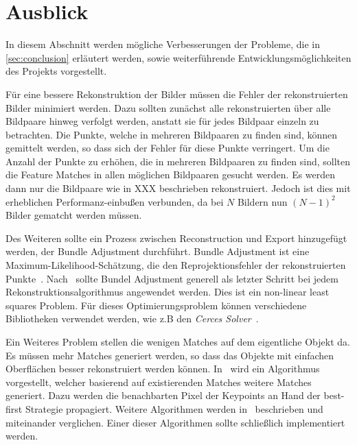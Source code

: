 \chapter{Ausblick}
\label{sec:outlook}

In diesem Abschnitt werden mögliche Verbesserungen der Probleme, die in \cref{sec:conclusion} erläutert werden, sowie weiterführende Entwicklungsmöglichkeiten des Projekts vorgestellt.

Für eine bessere Rekonstruktion der Bilder müssen die Fehler der rekonstruierten Bilder minimiert werden.
Dazu sollten zunächst alle rekonstruierten über alle Bildpaare hinweg verfolgt werden, anstatt sie für jedes Bildpaar einzeln zu betrachten.
Die Punkte, welche in mehreren Bildpaaren zu finden sind, können gemittelt werden, so dass sich der Fehler für diese Punkte verringert.
Um die Anzahl der Punkte zu erhöhen, die in mehreren Bildpaaren zu finden sind, sollten die Feature Matches in allen möglichen Bildpaaren gesucht werden.
Es werden dann nur die Bildpaare wie in XXX beschrieben rekonstruiert.
Jedoch ist dies mit erheblichen Performanz-einbußen verbunden, da bei $N$ Bildern nun $(N-1)^2$ Bilder gematcht werden müssen. %

Des Weiteren sollte ein Prozess zwischen Reconstruction und Export hinzugefügt werden, der Bundle Adjustment durchführt. 
Bundle Adjustment ist eine Maximum-Likelihood-Schätzung, die den Reprojektionsfehler der rekonstruierten Punkte~\cite{hartley_2003}.
Nach~\cite{hartley_2003} sollte Bundel Adjustment generell als letzter Schritt bei jedem Rekonstruktionsalgorithmus angewendet werden.
Dies ist ein non-linear least squares Problem. %
Für dieses Optimierungsproblem können verschiedene Bibliotheken verwendet werden, wie z.B den \emph{Cerces Solver}~\cite{cerces-solver}.
 
 Ein Weiteres Problem stellen die wenigen Matches auf dem eigentliche Objekt da.
 Es müssen mehr Matches generiert werden, so dass das Objekte mit einfachen Oberflächen besser rekonstruiert werden können.
 In~\cite{lhuillier_2002} wird ein Algorithmus vorgestellt, welcher basierend auf existierenden Matches weitere Matches generiert.
 Dazu werden die benachbarten Pixel der Keypoints an Hand der best-first Strategie propagiert.
 Weitere Algorithmen werden in~\cite{ahmadabadian_2013} beschrieben und miteinander verglichen.
 Einer dieser Algorithmen sollte schließlich implementiert werden.
 


